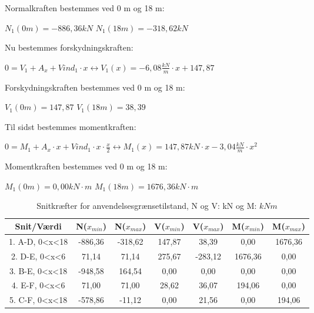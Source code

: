 Normalkraften bestemmes ved 0 m og 18 m:
\begin{center}
	$N_1(0m) = -886,\!36 kN$
	\newline
	$N_1(18m) = -318,\!62 kN$
\end{center}

Nu bestemmes forskydningskraften:
\begin{center}
	$0 = V_1 + A_x + Vind_1 \cdot x \leftrightarrow V_1(x) = -6,\!08 \frac{kN}{m} \cdot x + 147,\!87$
\end{center}

Forskydningskraften bestemmes ved 0 m og 18 m:
\begin{center}
	$V_1(0m) = 147,\!87$
	\newline
	$V_1(18m) = 38,\!39$
\end{center}

Til sidst bestemmes momentkraften:
\begin{center}
	$0 = M_1 + A_x \cdot x + Vind_1\cdot x\cdot \frac{x}{2} \leftrightarrow M_1(x) = 147,\!87 kN\cdot x - 3,\!04 \frac{kN}{m}\cdot x^2$
\end{center}

Momentkraften bestemmes ved 0 m og 18 m:
\begin{center}
	$M_1(0m) = 0,\!00 kN\cdot m$
	\newline
	$M_1(18m) = 1676,\!36 kN\cdot m$
\end{center}

\begin{table}
	\begin{center}
		\begin{tabular}{|c|c|c|c|c|c|c|}
			\hline
			Snit/Værdi & N($x_{min}$) & N($x_{max}$) & V($x_{min}$) & V($x_{max}$) & M($x_{min}$) & M($x_{max}$) 	\\ \hline
			1. A-D, 0<x<18 	& -886,36 	& -318,62 	&  147,87 	&  38,39 	&  0,00     &  1676,36        		\\ \hline
			2. D-E, 0<x<6  	&  71,14    &  71,14    &  275,67   & -283,12   &  1676,36  &  0,00    \\ \hline
			3. B-E, 0<x<18  & -948,58   &  164,54   &  0,00     &  0,00     &  0,00     &  0,00 			    \\ \hline
			4. E-F, 0<x<6   &  71,00    &  71,00    &  28,62    &  36,07    &  194,06   &  0,00     \\ \hline
			5. C-F, 0<x<18     & -578,86   & -11,12    &  0,00     &  21,56    &  0,00     &  194,06       		\\ \hline
		\end{tabular}
		\caption{Snitkræfter for anvendelsesgrænsetilstand, N og V: kN og M: $kNm$}
		\label{tab:anden2}
	\end{center}
\end{table}